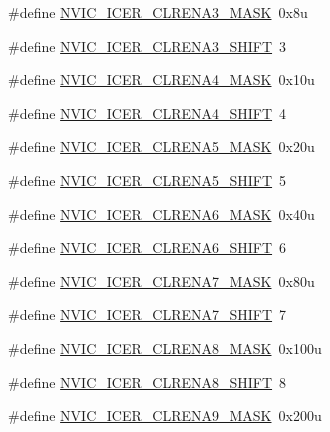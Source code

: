 \begin{DoxyCompactItemize}
\#define \hyperlink{group___n_v_i_c___register___masks_gae2c6f32f796b336c70e6aaf38bad7e46}{N\+V\+I\+C\+\_\+\+I\+C\+E\+R\+\_\+\+C\+L\+R\+E\+N\+A3\+\_\+\+M\+A\+SK}~0x8u
\item 
\#define \hyperlink{group___n_v_i_c___register___masks_ga761e59b6052075d1fbad955df87cc0e7}{N\+V\+I\+C\+\_\+\+I\+C\+E\+R\+\_\+\+C\+L\+R\+E\+N\+A3\+\_\+\+S\+H\+I\+FT}~3
\item 
\#define \hyperlink{group___n_v_i_c___register___masks_gac1c2d8b7b8a5994bce54a3f22cd530a9}{N\+V\+I\+C\+\_\+\+I\+C\+E\+R\+\_\+\+C\+L\+R\+E\+N\+A4\+\_\+\+M\+A\+SK}~0x10u
\item 
\#define \hyperlink{group___n_v_i_c___register___masks_gafe34b7d4fe083dd11f38f7f71ca51717}{N\+V\+I\+C\+\_\+\+I\+C\+E\+R\+\_\+\+C\+L\+R\+E\+N\+A4\+\_\+\+S\+H\+I\+FT}~4
\item 
\#define \hyperlink{group___n_v_i_c___register___masks_ga6771f39f27961d5d1be75a582a06a575}{N\+V\+I\+C\+\_\+\+I\+C\+E\+R\+\_\+\+C\+L\+R\+E\+N\+A5\+\_\+\+M\+A\+SK}~0x20u
\item 
\#define \hyperlink{group___n_v_i_c___register___masks_ga825e88881d4ee1d0bec9c7333e7674cb}{N\+V\+I\+C\+\_\+\+I\+C\+E\+R\+\_\+\+C\+L\+R\+E\+N\+A5\+\_\+\+S\+H\+I\+FT}~5
\item 
\#define \hyperlink{group___n_v_i_c___register___masks_gadab47a8f4b0e811c17c5ce92a79571f7}{N\+V\+I\+C\+\_\+\+I\+C\+E\+R\+\_\+\+C\+L\+R\+E\+N\+A6\+\_\+\+M\+A\+SK}~0x40u
\item 
\#define \hyperlink{group___n_v_i_c___register___masks_gaae10f584a53307fc3737d838494b8ac4}{N\+V\+I\+C\+\_\+\+I\+C\+E\+R\+\_\+\+C\+L\+R\+E\+N\+A6\+\_\+\+S\+H\+I\+FT}~6
\item 
\#define \hyperlink{group___n_v_i_c___register___masks_ga56c619b446fb239c09604ce277d3f41a}{N\+V\+I\+C\+\_\+\+I\+C\+E\+R\+\_\+\+C\+L\+R\+E\+N\+A7\+\_\+\+M\+A\+SK}~0x80u
\item 
\#define \hyperlink{group___n_v_i_c___register___masks_ga15b8abc7e590d17213a8cce591d0f911}{N\+V\+I\+C\+\_\+\+I\+C\+E\+R\+\_\+\+C\+L\+R\+E\+N\+A7\+\_\+\+S\+H\+I\+FT}~7
\item 
\#define \hyperlink{group___n_v_i_c___register___masks_gaf644b80bbafecefd8d04f18283b93622}{N\+V\+I\+C\+\_\+\+I\+C\+E\+R\+\_\+\+C\+L\+R\+E\+N\+A8\+\_\+\+M\+A\+SK}~0x100u
\item 
\#define \hyperlink{group___n_v_i_c___register___masks_ga57bb6d50a88cc2522f9b224521c0450a}{N\+V\+I\+C\+\_\+\+I\+C\+E\+R\+\_\+\+C\+L\+R\+E\+N\+A8\+\_\+\+S\+H\+I\+FT}~8
\item 
\#define \hyperlink{group___n_v_i_c___register___masks_gafe4a12c015df1c3b5c366e4dccfbbe69}{N\+V\+I\+C\+\_\+\+I\+C\+E\+R\+\_\+\+C\+L\+R\+E\+N\+A9\+\_\+\+M\+A\+SK}~0x200u

\end{DoxyCompactItemize}
